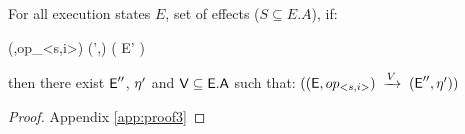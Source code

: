 %
%

\begin{theorem}
\label{theorem:three}
For all execution states $E$, set of effects
($S\subseteq E.A$), if: 
\begin{fmathpar}
 {(\E,op_{<s,i>})} {} {(\E',\eff)} \spc \wedge \spc ( \psi {} E' )  
\end{fmathpar}
then there exist  ${\normalfont \textsf{E}}''$, $\eta'$ and ${\normalfont \textsf{V}}\subseteq {\normalfont \textsf{E}}.{\normalfont \textsf{A}}$ such that:
$(({\normalfont \textsf{E}},op_{<s,i>})\;\xrightarrow{V}\;({\normalfont \textsf{E}}'',\eta'))$
\end{theorem}
\begin{proof}
Appendix \ref{app:proof3}
\end{proof}

